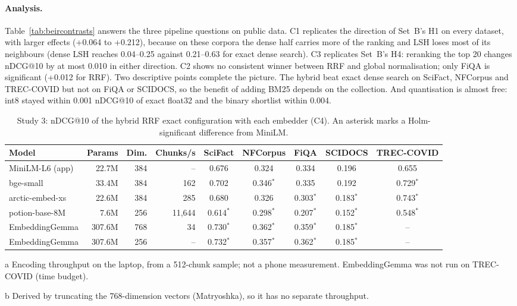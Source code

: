 \documentclass[11pt,a4paper]{article}
\makeatletter
\newcommand{\ndcg}{nDCG@10}
\makeatother
\begin{document}
\paragraph{Analysis.} Table~\ref{tab:beircontrasts} answers the three pipeline questions on public data. C1 replicates the direction of Set~B's H1 on every dataset, with larger effects (+0.064 to +0.212), because on these corpora the dense half carries more of the ranking and LSH loses most of its neighbours (dense LSH reaches 0.04--0.25 against 0.21--0.63 for exact dense search). C3 replicates Set~B's H4: reranking the top 20 changes \ndcg{} by at most 0.010 in either direction. C2 shows no consistent winner between RRF and global normalisation; only FiQA is significant (+0.012 for RRF). Two descriptive points complete the picture. The hybrid beat exact dense search on SciFact, NFCorpus and TREC-COVID but not on FiQA or SCIDOCS, so the benefit of adding BM25 depends on the collection. And quantisation is almost free: int8 stayed within 0.001 \ndcg{} of exact float32 and the binary shortlist within 0.004.

\begin{table}[tbp]
\centering\footnotesize\setlength{\tabcolsep}{4pt}
\begin{threeparttable}
\caption{Study 3: \ndcg{} of the hybrid RRF exact configuration with each embedder (C4). An asterisk marks a Holm-significant difference from MiniLM.}
\label{tab:embedders}
\begin{tabular}{lrrrccccc}
\toprule
Model & Params & Dim. & Chunks/s\tnote{a} & SciFact & NFCorpus & FiQA & SCIDOCS & TREC-COVID \\
\midrule
MiniLM-L6 (app) & 22.7M & 384 & -- & 0.676 & 0.324 & 0.334 & 0.196 & 0.655 \\
bge-small & 33.4M & 384 & 162 & 0.702 & 0.346$^{*}$ & 0.335 & 0.192 & 0.729$^{*}$ \\
arctic-embed-xs & 22.6M & 384 & 285 & 0.680 & 0.326 & 0.303$^{*}$ & 0.183$^{*}$ & 0.743$^{*}$ \\
potion-base-8M & 7.6M & 256 & 11,644 & 0.614$^{*}$ & 0.298$^{*}$ & 0.207$^{*}$ & 0.152$^{*}$ & 0.548$^{*}$ \\
EmbeddingGemma & 307.6M & 768 & 34 & 0.730$^{*}$ & 0.362$^{*}$ & 0.359$^{*}$ & 0.185$^{*}$ & -- \\
EmbeddingGemma & 307.6M & 256 & --\tnote{b} & 0.732$^{*}$ & 0.357$^{*}$ & 0.362$^{*}$ & 0.185$^{*}$ & -- \\
\bottomrule
\end{tabular}
\begin{tablenotes}\footnotesize
\item[a] Encoding throughput on the laptop, from a 512-chunk sample; not a phone measurement. EmbeddingGemma was not run on TREC-COVID (time budget).
\item[b] Derived by truncating the 768-dimension vectors (Matryoshka), so it has no separate throughput.
\end{tablenotes}
\end{threeparttable}
\end{table}
\end{document}
